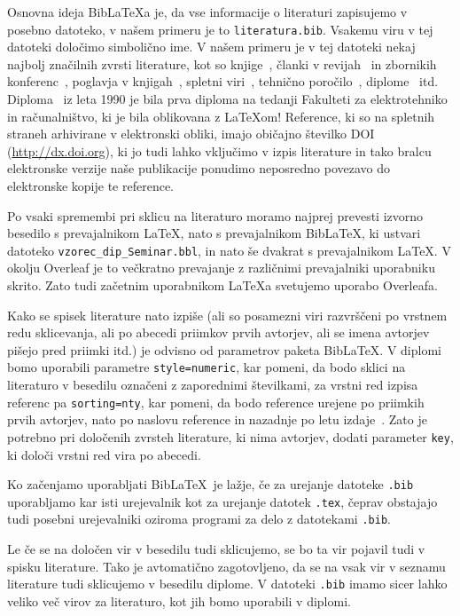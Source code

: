 \documentclass[a4paper,12pt,openright]{book}
\newcommand{\BibLaTeX}{{\sc Bib}\LaTeX}
\begin{document}
Osnovna ideja \BibLaTeX{a} je, da vse informacije o literaturi zapisujemo v posebno datoteko, v našem primeru je to \texttt{literatura.bib}.
Vsakemu viru v tej datoteki določimo simbolično ime.
V  našem primeru je v tej datoteki nekaj najbolj značilnih zvrsti literature, kot so knjige~\cite{lamport}, 
članki v revijah~\cite{leonardo} in zbornikih konferenc~\cite{ciuha2010visualization},
poglavja v knjigah~\cite{poglavje_springer}, 
spletni viri~\cite{slovarji,video}, 
tehnično poročilo~\cite{andersen2012kinect}, 
diplome~\cite{diploma} itd.
Diploma~\cite{diploma} iz leta 1990 je bila prva diploma na tedanji Fakulteti za elektrotehniko in računalništvo, ki je bila oblikovana z \LaTeX om!
Reference, ki so na spletnih straneh arhivirane v elektronski obliki, imajo običajno  \v stevilko DOI (\url{http://dx.doi.org}), ki jo tudi lahko vključimo v izpis literature in tako bralcu elektronske verzije naše publikacije ponudimo neposredno povezavo do elektronske kopije te reference.

Po vsaki spremembi pri sklicu na literaturo moramo najprej prevesti izvorno besedilo s prevajalnikom \LaTeX, nato s prevajalnikom  \BibLaTeX, ki ustvari datoteko  {\tt vzorec\_dip\_Seminar.bbl}, in nato še dvakrat s prevajalnikom  \LaTeX.
V okolju Overleaf je to večkratno prevajanje z različnimi prevajalniki uporabniku skrito. Zato tudi začetnim uporabnikom \LaTeX a svetujemo uporabo Overleafa.

Kako se spisek literature nato izpiše (ali so posamezni viri razvrščeni po vrstnem redu sklicevanja, ali po abecedi priimkov prvih avtorjev, ali se imena avtorjev pišejo pred priimki itd.) je odvisno od parametrov paketa \BibLaTeX.
V diplomi bomo uporabili parametre 
\texttt{style=numeric}, kar pomeni, da bodo sklici na literaturo v besedilu označeni z zaporednimi številkami, za vrstni red izpisa referenc pa 
\texttt{sorting=nty}, kar pomeni, da bodo reference urejene po priimkih prvih avtorjev, nato po naslovu reference in nazadnje po letu izdaje~\cite{ctan}.
Zato je potrebno pri določenih zvrsteh literature, ki nima avtorjev, dodati parameter \texttt{key}, ki določi vrstni red vira po abecedi.

Ko začenjamo uporabljati \BibLaTeX\ je lažje, če za urejanje datoteke \texttt{.bib} uporabljamo kar isti urejevalnik kot za urejanje datotek \texttt{.tex}, 
čeprav obstajajo tudi posebni urejevalniki oziroma programi za delo z datotekami \texttt{.bib}.

Le če se  na določen vir v besedilu tudi sklicujemo, se bo ta vir pojavil tudi v spisku literature.
Tako je avtomatično zagotovljeno, da se na vsak vir v seznamu literature tudi sklicujemo v besedilu diplome.
V datoteki \texttt{.bib} imamo sicer lahko veliko več virov za literaturo, kot jih bomo uporabili v diplomi.
\end{document}

